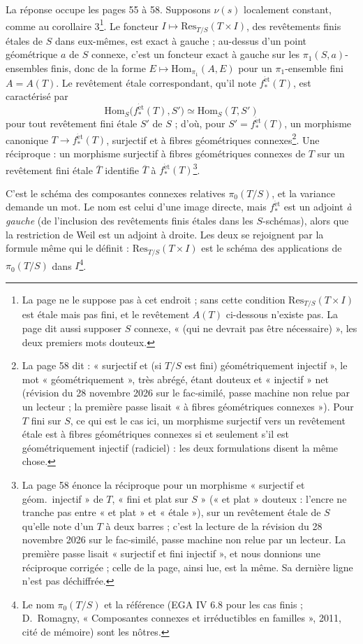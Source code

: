 \documentclass[11pt,a4paper]{article}
\begin{document}
La réponse occupe les pages 55 à 58. Supposons $\nu(s)$ localement constant,
comme au corollaire 3\footnote{La page ne le suppose pas à cet endroit ; sans
cette condition $\mathrm{Res}_{T/S}(T \times I)$ est étale mais pas fini, et le
revêtement $A(T)$ ci-dessous n'existe pas. La page dit aussi supposer $S$
connexe, « (qui ne devrait pas être nécessaire) », les deux premiers mots
douteux.}. Le foncteur $I \mapsto
\mathrm{Res}_{T/S}(T \times I)$, des revêtements finis étales de $S$ dans
eux-mêmes, est exact à gauche ; au-dessus d'un point géométrique $a$ de $S$
connexe, c'est un foncteur exact à gauche sur les $\pi_1(S,a)$-ensembles finis,
donc de la forme $E \mapsto \mathrm{Hom}_{\pi_1}(A, E)$ pour un $\pi_1$-ensemble
fini $A = A(T)$. Le revêtement étale correspondant, qu'il note
$f^{\mathrm{\acute{e}t}}_{*}(T)$, est caractérisé par
\[
  \mathrm{Hom}_S\bigl(f^{\mathrm{\acute{e}t}}_{*}(T), S'\bigr) \simeq \mathrm{Hom}_S(T, S')
\]
pour tout revêtement fini étale $S'$ de $S$ ; d'où, pour $S' =
f^{\mathrm{\acute{e}t}}_{*}(T)$, un morphisme canonique $T \to
f^{\mathrm{\acute{e}t}}_{*}(T)$, surjectif et à fibres géométriques
connexes\footnote{La page 58 dit : « surjectif et (si $T/S$ est fini)
géométriquement injectif », le mot « géométriquement », très abrégé, étant
douteux et « injectif » net (révision du 28 novembre 2026 sur le fac-similé, passe machine non relue par un lecteur ; la première passe lisait « à fibres
géométriques connexes »). Pour $T$ fini sur $S$, ce qui est le cas ici, un
morphisme surjectif vers un revêtement étale est à fibres géométriques
connexes si et seulement s'il est géométriquement injectif (radiciel) : les
deux formulations disent la même chose.}. Une
réciproque : un morphisme surjectif à fibres géométriques connexes de $T$ sur
un revêtement fini étale $\overline{T}$ identifie $\overline{T}$ à
$f^{\mathrm{\acute{e}t}}_{*}(T)$\footnote{La page 58 énonce la réciproque pour un
morphisme « surjectif et géom.\ injectif » de $T$, « fini et plat sur $S$ »
(« et plat » douteux : l'encre ne tranche pas entre « et plat » et
« étale »), sur un revêtement étale de $S$ qu'elle note d'un $T$ à deux
barres ; c'est la lecture de la révision du 28 novembre 2026 sur le fac-similé, passe machine non relue par un lecteur. La première passe lisait « surjectif et fini
injectif », et nous donnions une réciproque corrigée ; celle de la page,
ainsi lue, est la même. Sa dernière ligne n'est pas déchiffrée.}.

C'est le schéma des composantes connexes relatives $\pi_0(T/S)$, et la
variance demande un mot. Le nom est celui d'une image directe, mais
$f^{\mathrm{\acute{e}t}}_{*}$ est un adjoint \emph{à gauche} (de l'inclusion des
revêtements finis étales dans les $S$-schémas), alors que la restriction de
Weil est un adjoint à droite. Les deux se rejoignent par la formule même qui
le définit : $\mathrm{Res}_{T/S}(T \times I)$ est le schéma des applications de
$\pi_0(T/S)$ dans $I$\footnote{Le nom $\pi_0(T/S)$ et la référence (EGA IV 6.8
pour les cas finis ; D.~Romagny, « Composantes connexes et irréductibles en
familles », 2011, cité de mémoire) sont les nôtres.}.
\end{document}

